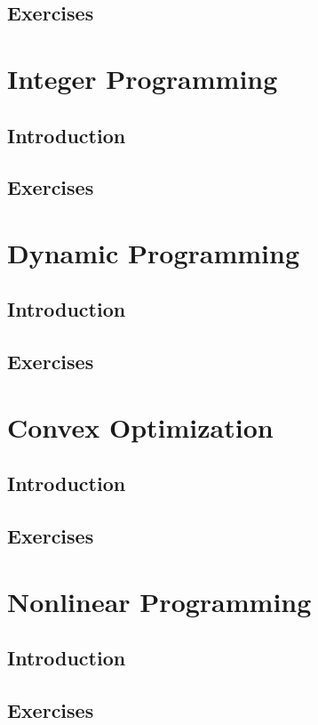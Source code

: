 \documentclass[10pt, twocolumn]{book}
\begin{document}
	\chapter{Exercises}

\part{Integer Programming}
	\chapter{Introduction}

	\chapter{Exercises}

\part{Dynamic Programming}
	\chapter{Introduction}

	\chapter{Exercises}

\part{Convex Optimization}
	\chapter{Introduction}

	\chapter{Exercises}

\part{Nonlinear Programming}
	\chapter{Introduction}

	\chapter{Exercises}
\end{document}
